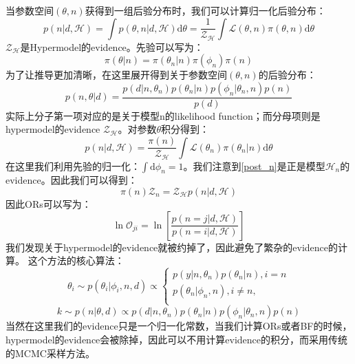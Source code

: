 当参数空间$(\theta,n)$获得到一组后验分布时，我们可以计算归一化后验分布：
\begin{equation}
    p(n|d,\mathcal{H})=\int p(\theta,n|d,\mathcal{H})\textrm{d}\theta
    =\frac{1}{\mathcal{Z}_{\mathcal{H}}}\int\mathcal{L}(\theta,n)\pi(\theta,n)\textrm{d}\theta
\end{equation}
$\mathcal{Z}_{\mathcal{H}}$是Hypermodel的evidence。先验可以写为：
\begin{equation}
    \pi(\theta|n)=\pi(\theta_n|n)\pi(\phi_n)\pi(n)
\end{equation}
为了让推导更加清晰，在这里展开得到关于参数空间$(\theta,n)$的后验分布：
\begin{equation}
    p(n,\theta|d)=\frac{p(d|n,\theta_n)p(\theta_n|n)p(\phi_n|\theta_n,n)p(n)}{p(d)}
\end{equation}
实际上分子第一项对应的是关于模型n的likelihood function；而分母项则是hypermodel的evidence $\mathcal{Z}_{\mathcal{H}}$。对参数$\theta$积分得到：
\begin{equation}
    p(n|d,\mathcal{H})=\frac{\pi(n)}{\mathcal{Z}_{\mathcal{H}}}\int\mathcal{L}(\theta_n)\pi(\theta_n|n)\textrm{d}\theta  \label{post_n}
\end{equation}
在这里我们利用先验的归一化：$\int \textrm{d}\phi_n=1$。我们注意到\ref{post_n}是正是模型$\mathcal{H}_n$的evidence。因此我们可以得到：
\begin{equation}
    \pi(n)\mathcal{Z}_n=\mathcal{Z}_{\mathcal{H}}p(n|d,\mathcal{H})
\end{equation}
因此ORs可以写为：
\begin{equation}
    \ln \mathcal{O}_{ji} = \ln\left[\frac{p(n=j|d,\mathcal{H})}{p(n=i|d,\mathcal{H})}\right]
\end{equation}
我们发现关于hypermodel的evidence就被约掉了，因此避免了繁杂的evidence的计算。
这个方法的核心算法\cite{godsill_relationship_2001,hee_bayesian_2016}：
\begin{equation}
    \theta_i \sim p(\theta_i|\phi_i,n,d)\propto 
    \begin{cases}
        p(y|n,\theta_n)p(\theta_n|n),i=n\\
        p(\theta_n|\phi_n,n),i\neq n,\\
    \end{cases}
\end{equation}
\begin{equation}
    k\sim p(n|\theta,d)\propto p(d|n,\theta_n)p(\theta_n|n)p(\phi_n|\theta_n,n)p(n)
\end{equation}
当然在这里我们的evidence只是一个归一化常数，当我们计算ORs或者BF的时候，hypermodel的evidence会被除掉，因此可以不用计算evidence的积分，而采用传统的MCMC采样方法。